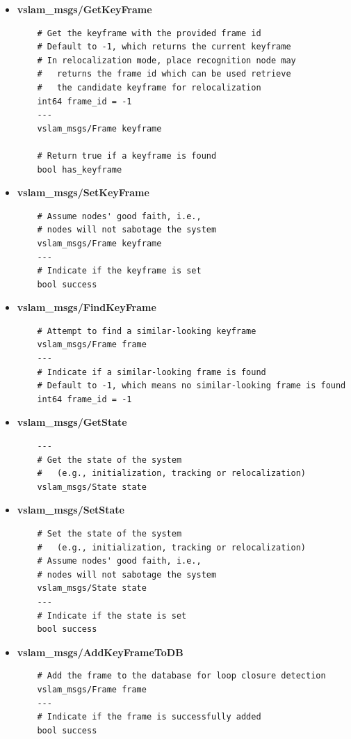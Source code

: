 \begin{itemize}
  \item \textbf{vslam\_msgs/GetKeyFrame}
  \begin{verbatim}
    # Get the keyframe with the provided frame id
    # Default to -1, which returns the current keyframe
    # In relocalization mode, place recognition node may 
    #   returns the frame id which can be used retrieve 
    #   the candidate keyframe for relocalization
    int64 frame_id = -1
    ---
    vslam_msgs/Frame keyframe
    
    # Return true if a keyframe is found
    bool has_keyframe
  \end{verbatim}

  \item \textbf{vslam\_msgs/SetKeyFrame}
  \begin{verbatim}
    # Assume nodes' good faith, i.e.,
    # nodes will not sabotage the system
    vslam_msgs/Frame keyframe
    ---
    # Indicate if the keyframe is set
    bool success
  \end{verbatim}

  \item \textbf{vslam\_msgs/FindKeyFrame}
  \begin{verbatim}
    # Attempt to find a similar-looking keyframe
    vslam_msgs/Frame frame
    ---
    # Indicate if a similar-looking frame is found
    # Default to -1, which means no similar-looking frame is found
    int64 frame_id = -1
  \end{verbatim}

  \item \textbf{vslam\_msgs/GetState}
  \begin{verbatim}
    ---
    # Get the state of the system 
    #   (e.g., initialization, tracking or relocalization)
    vslam_msgs/State state
  \end{verbatim}

  \item \textbf{vslam\_msgs/SetState}
  \begin{verbatim}
    # Set the state of the system 
    #   (e.g., initialization, tracking or relocalization)
    # Assume nodes' good faith, i.e.,
    # nodes will not sabotage the system
    vslam_msgs/State state
    ---
    # Indicate if the state is set
    bool success
  \end{verbatim}

  \item \textbf{vslam\_msgs/AddKeyFrameToDB}
  \begin{verbatim}
    # Add the frame to the database for loop closure detection
    vslam_msgs/Frame frame
    ---
    # Indicate if the frame is successfully added
    bool success
  \end{verbatim}
\end{itemize}

